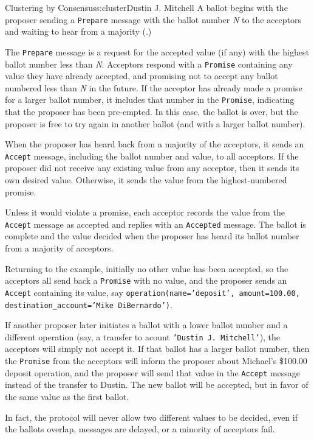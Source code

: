 \begin{aosachapter}{Clustering by Consensus}{s:cluster}{Dustin J. Mitchell}
A ballot begins with the proposer sending a \texttt{Prepare} message
with the ballot number \emph{N} to the acceptors and waiting to hear
from a majority (.)

The \texttt{Prepare} message is a request for the accepted value (if
any) with the highest ballot number less than \emph{N}. Acceptors
respond with a \texttt{Promise} containing any value they have already
accepted, and promising not to accept any ballot numbered less than
\emph{N} in the future. If the acceptor has already made a promise for a
larger ballot number, it includes that number in the \texttt{Promise},
indicating that the proposer has been pre-empted. In this case, the
ballot is over, but the proposer is free to try again in another ballot
(and with a larger ballot number).

When the proposer has heard back from a majority of the acceptors, it
sends an \texttt{Accept} message, including the ballot number and value,
to all acceptors. If the proposer did not receive any existing value
from any acceptor, then it sends its own desired value. Otherwise, it
sends the value from the highest-numbered promise.

Unless it would violate a promise, each acceptor records the value from
the \texttt{Accept} message as accepted and replies with an
\texttt{Accepted} message. The ballot is complete and the value decided
when the proposer has heard its ballot number from a majority of
acceptors.

Returning to the example, initially no other value has been accepted, so
the acceptors all send back a \texttt{Promise} with no value, and the
proposer sends an \texttt{Accept} containing its value, say
\texttt{operation(name='deposit', amount=100.00, destination\_account='Mike DiBernardo')}.

If another proposer later initiates a ballot with a lower ballot number
and a different operation (say, a transfer to acount
\texttt{'Dustin J. Mitchell'}), the acceptors will simply not accept it.
If that ballot has a larger ballot number, then the \texttt{Promise}
from the acceptors will inform the proposer about Michael's \$100.00
deposit operation, and the proposer will send that value in the
\texttt{Accept} message instead of the transfer to Dustin. The new
ballot will be accepted, but in favor of the same value as the first
ballot.

In fact, the protocol will never allow two different values to be
decided, even if the ballots overlap, messages are delayed, or a
minority of acceptors fail.


\end{aosachapter}
